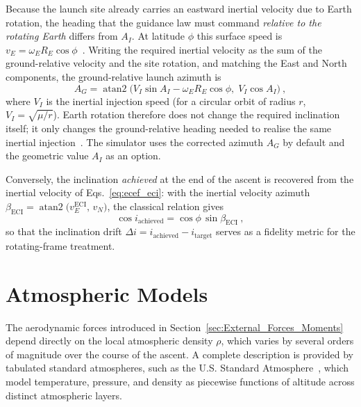 Because the launch site already carries an eastward inertial velocity due to Earth rotation, the heading that the guidance law must command \emph{relative to the rotating Earth} differs from $A_I$. At latitude $\phi$ this surface speed is $v_E = \omega_E R_E\cos\phi$~\cite{Edberg}. Writing the required inertial velocity as the sum of the ground-relative velocity and the site rotation, and matching the East and North components, the ground-relative launch azimuth is~\cite{BateMuellerWhite1971Fundamentals,curtis2020orbital}
\begin{equation}
A_G = \operatorname{atan2}\!\bigl(V_I\sin A_I - \omega_E R_E\cos\phi,\; V_I\cos A_I\bigr) \ ,
\label{eq:ground_azimuth}
\end{equation}
where $V_I$ is the inertial injection speed (for a circular orbit of radius $r$, $V_I=\sqrt{\mu/r}$). Earth rotation therefore does not change the required inclination itself; it only changes the ground-relative heading needed to realise the same inertial injection~\cite{curtis2020orbital}. The simulator uses the corrected azimuth $A_G$ by default and the geometric value $A_I$ as an option.

Conversely, the inclination \emph{achieved} at the end of the ascent is recovered from the inertial velocity of Eqs.~\eqref{eq:ecef_eci}: with the inertial velocity azimuth $\beta_{\mathrm{ECI}} = \operatorname{atan2}\!\bigl(v_E^{\mathrm{ECI}},\,v_N\bigr)$, the classical relation gives~\cite{curtis2020orbital}
\begin{equation}
\cos i_{\mathrm{achieved}} = \cos\phi\,\sin\beta_{\mathrm{ECI}} \ ,
\label{eq:achieved_inclination}
\end{equation}
so that the inclination drift $\Delta i = i_{\mathrm{achieved}} - i_{\mathrm{target}}$ serves as a fidelity metric for the rotating-frame treatment.


\section{Atmospheric Models}
\label{sec:atm_models}

The aerodynamic forces introduced in Section~\ref{sec:External_Forces_Moments} depend directly on the local atmospheric density $\rho$, which varies by several orders of magnitude over the course of the ascent. A complete description is provided by tabulated standard atmospheres, such as the U.S. Standard Atmosphere~\cite{usstandard1976}, which model temperature, pressure, and density as piecewise functions of altitude across distinct atmospheric layers.


